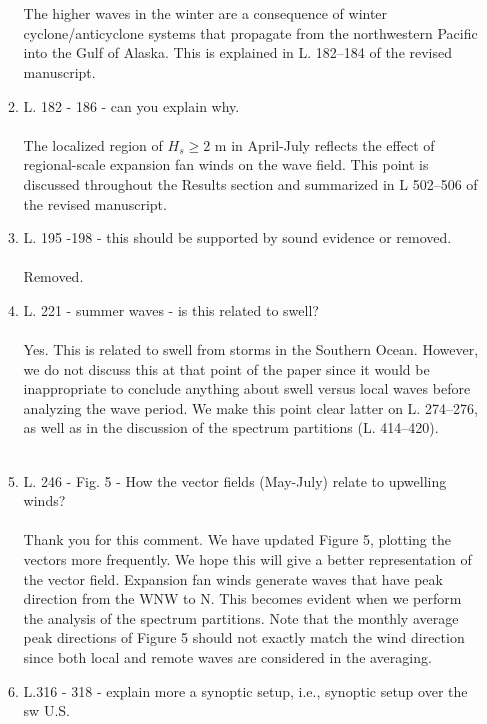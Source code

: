 \documentclass{article}
\begin{document}
\begin{enumerate}
\begin{enumerate}
\\\\
{\color{blue} The higher waves in the winter are a consequence of winter cyclone/anticyclone 
systems that propagate from the northwestern Pacific into the Gulf of Alaska. This is explained in L. 182--184 of the revised manuscript.}
\\
\item L. 182 - 186 - can you explain why. \\\\
{\color{blue} The localized region of $H_s \geq 2$ m in April-July reflects the effect of regional-scale
expansion fan winds on the wave field. This point is discussed throughout the Results section and 
summarized in L 502--506 of the revised manuscript.}\\

\item L. 195 -198 - this should be supported by sound evidence or removed.\\\\
{\color{blue} Removed.}
\\
\item L. 221 - summer waves - is this related to swell?
\\\\
{\color{blue} Yes. This is related to swell from storms in the Southern Ocean. However, we do not discuss this at that point of the paper since it would be inappropriate to conclude anything about swell versus local waves before analyzing the wave period. We make this point clear latter on L. 274--276, as well as in the discussion of the spectrum partitions (L. 414--420).  
}
\\\\
\item L. 246 - Fig. 5 - How the vector fields (May-July) relate to upwelling winds?
\\\\
{\color{blue} Thank you for this comment. We have updated Figure 5, plotting the vectors more frequently. We hope this will give a better representation of the vector field. Expansion fan winds generate waves that have peak direction from the WNW to N. This becomes evident when we perform the analysis of the spectrum partitions. Note that the monthly average peak directions of Figure 5 should not exactly match the wind direction since both local and remote waves are considered in the averaging.}
\\
\item L.316 - 318 - explain more a synoptic setup, i.e., synoptic setup over the sw U.S.
\\\\


\end{enumerate}
\end{enumerate}
\end{document}
